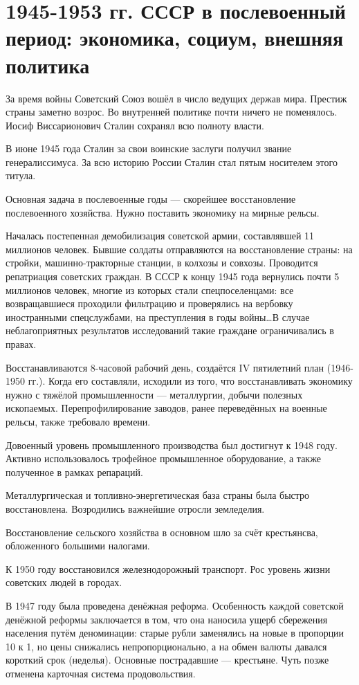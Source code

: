 \documentclass{article}
\begin{document}
\section{1945-1953 гг. СССР в послевоенный период: экономика, социум, внешняя политика}

За время войны Советский Союз вошёл в число ведущих держав мира. Престиж страны заметно возрос. Во внутренней политике почти ничего не поменялось. Иосиф Виссарионович Сталин сохранял всю полноту власти.

В июне 1945 года Сталин за свои воинские заслуги получил звание генералиссимуса. За всю историю России Сталин стал пятым носителем этого титула.

Основная задача в послевоенные годы --- скорейшее восстановление послевоенного хозяйства. Нужно поставить экономику на мирные рельсы.

Началась постепенная демобилизация советской армии, составлявшей 11 миллионов человек. Бывшие солдаты отправляются на восстановление страны: на стройки, машинно-тракторные станции, в колхозы и совхозы. Проводится репатриация советских граждан. В СССР к концу 1945 года вернулись почти 5 миллионов человек, многие из которых стали спецпоселенцами: все возвращавшиеся проходили фильтрацию и проверялись на вербовку иностранными спецслужбами, на преступления в годы войны\dots В случае неблагоприятных результатов исследований такие граждане ограничивались в правах.

Восстанавливаются 8-часовой рабочий день, создаётся IV пятилетний план (1946-1950 гг.). Когда его составляли, исходили из того, что восстанавливать экономику нужно с тяжёлой промышленности --- металлургии, добычи полезных ископаемых. Перепрофилирование заводов, ранее переведённых на военные рельсы, также требовало времени.

Довоенный уровень промышленного производства был достигнут к 1948 году. Активно использовалось трофейное промышленное оборудование, а также полученное в рамках репараций.

Металлургическая и топливно-энергетическая база страны была быстро восстановлена. Возродились важнейшие отросли земледелия.

Восстановление сельского хозяйства в основном шло за счёт крестьянсва, обложенного большими налогами.

К 1950 году восстановился железнодорожный транспорт. Рос уровень жизни советских людей в городах.

В 1947 году была проведена денёжная реформа. Особенность каждой советской денёжной реформы заключается в том, что она наносила ущерб сбережения населения путём деноминации: старые рубли заменялись на новые в пропорции 10 к 1, но цены снижались непропорционально, а на обмен валюты давался короткий срок (неделья). Основные пострадавшие --- крестьяне. Чуть позже отменена карточная система продовольствия.
\end{document}
